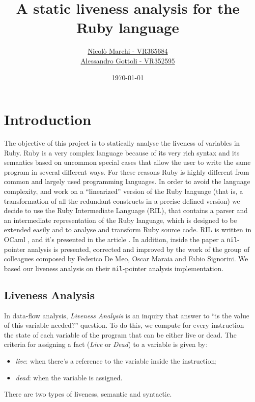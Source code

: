 \documentclass[a4paper]{article}   %
\begin{document}
\title{A static liveness analysis for the Ruby language}   %
\author{\href{mailto:nicolo.marchi@studenti.univr.it}{Nicolò Marchi - VR365684} \\ 
\href{mailto:alessandro.gottoli@studenti.univr.it}{Alessandro Gottoli - VR352595}}
\date{\today}    %
\maketitle

\vspace{5cm}
\pagebreak
\tableofcontents
\pagebreak




\section{Introduction}             %

The objective of this project is to statically analyse the liveness of variables in Ruby. Ruby is a very complex language because of its very rich syntax and its semantics based on uncommon special cases that allow the user to write the same program in several different ways. For these reasons Ruby is highly different from common and largely used programming languages.
In order to avoid the language complexity, and work on a ``linearized'' version of the Ruby language (that is, a transformation of all the redundant constructs in a precise defined version) we decide to use the Ruby Intermediate Language (RIL), that contains a parser and an intermediate representation of the Ruby language, which is designed to be extended easily and to analyse and transform Ruby source code.
RIL is written in OCaml \cite{ocaml}, and it's presented in the article \cite{ril}. In addition, inside the paper a \texttt{nil}-pointer analysis is presented, corrected and improved by the work \cite{meo} of the group of colleagues composed by Federico De Meo, Oscar Maraia and Fabio Signorini. We based our liveness analysis on their \texttt{nil}-pointer analysis implementation.

\subsection{Liveness Analysis}
In data-flow analysis, \emph{Liveness Analysis} is an inquiry that answer to ``is the value of this variable needed?'' question. To do this, we compute for every instruction the state of each variable of the program that can be either live or dead.
The criteria for assigning a fact (\emph{Live} or \emph{Dead}) to a variable is given by:
\begin{itemize}
\item \emph{live}: when there's a reference to the variable inside the instruction; %
\item \emph{dead}: when the variable is assigned.
\end{itemize} 
There are two types of liveness, semantic and syntactic. 
\end{document}
